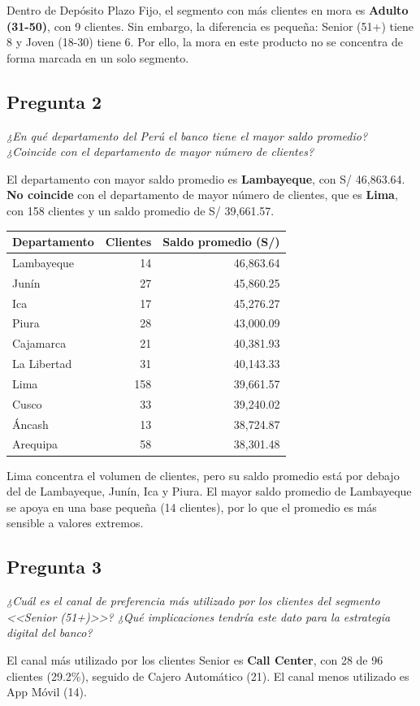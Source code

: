 \documentclass[11pt,a4paper]{article}
\newcommand{\pregunta}[2]{\subsection*{Pregunta #1}\textit{#2}}
\begin{document}
Dentro de Depósito Plazo Fijo, el segmento con más clientes en mora es \textbf{Adulto (31-50)}, con 9 clientes. Sin embargo, la diferencia es pequeña: Senior (51+) tiene 8 y Joven (18-30) tiene 6. Por ello, la mora en este producto no se concentra de forma marcada en un solo segmento.

\pregunta{2}{¿En qué departamento del Perú el banco tiene el mayor saldo promedio? ¿Coincide con el departamento de mayor número de clientes?}

El departamento con mayor saldo promedio es \textbf{Lambayeque}, con S/ 46,863.64. \textbf{No coincide} con el departamento de mayor número de clientes, que es \textbf{Lima}, con 158 clientes y un saldo promedio de S/ 39,661.57.

\begin{center}
\begin{tabular}{@{}lrr@{}}
\toprule
Departamento & Clientes & Saldo promedio (S/) \\
\midrule
Lambayeque & 14 & 46,863.64 \\
Junín & 27 & 45,860.25 \\
Ica & 17 & 45,276.27 \\
Piura & 28 & 43,000.09 \\
Cajamarca & 21 & 40,381.93 \\
La Libertad & 31 & 40,143.33 \\
Lima & 158 & 39,661.57 \\
Cusco & 33 & 39,240.02 \\
Áncash & 13 & 38,724.87 \\
Arequipa & 58 & 38,301.48 \\
\bottomrule
\end{tabular}
\end{center}

Lima concentra el volumen de clientes, pero su saldo promedio está por debajo del de Lambayeque, Junín, Ica y Piura. El mayor saldo promedio de Lambayeque se apoya en una base pequeña (14 clientes), por lo que el promedio es más sensible a valores extremos.

\pregunta{3}{¿Cuál es el canal de preferencia más utilizado por los clientes del segmento <<Senior (51+)>>? ¿Qué implicaciones tendría este dato para la estrategia digital del banco?}

El canal más utilizado por los clientes Senior es \textbf{Call Center}, con 28 de 96 clientes (29.2\%), seguido de Cajero Automático (21). El canal menos utilizado es App Móvil (14).
\end{document}
